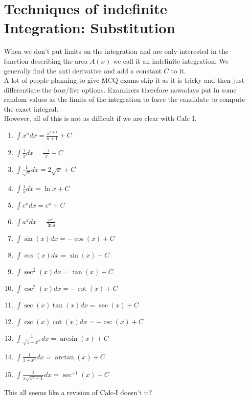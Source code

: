 \section{Techniques of indefinite Integration: Substitution}
When we don't put limits on the integration and are only interested in the function describing the area $A(x)$ we call it an indefinite integration. We generally find the anti derivative and add a constant $C$ to it.\\
A lot of people planning to give MCQ exams skip it as it is tricky and then just differentiate the four/five options. Examiners therefore nowadays put in some random values as the limits of the integration to force the candidate to compute the exact integral.\\
However, all of this is not as difficult if we are clear with Calc I.\\
\begin{theorem}
\begin{enumerate}
    \item $\int x^n dx = \frac{x^{n+1}}{n+1} + C$\\
    \item $\int \frac{1}{x} dx = \frac{-1}{x}+C$\\
    \item $\int \frac{1}{\sqrt{x}} dx = 2\sqrt{x}+C$
    \item $\int \frac{1}{x} dx=\ln{x}+C$\\
    \item $\int e^x dx = e^x+C$\\
    \item $\int a^x dx = \frac{a^x}{\ln{a}}$
    \item $\int \sin(x) dx = -\cos(x) + C$
    \item $\int \cos(x) dx = \sin(x) + C$
    \item $\int \sec^2(x) dx = \tan(x) + C$
    \item $\int \csc^2(x) dx = -\cot(x) + C$
    \item $\int \sec(x)\tan(x) dx = \sec(x) + C$
    \item $\int \csc(x)\cot(x) dx = -\csc(x) + C$
    \item $\int \frac{1}{\sqrt{1-x^2}}dx=\arcsin(x)+C$
    \item $\int \frac{1}{1+x^2}dx=\arctan(x)+C$
    \item $\int \frac{1}{x\sqrt{x^2-1}}dx=\sec^{-1}(x)+C$
\end{enumerate}
\end{theorem}
This all seems like a revision of Calc-I doesn't it?\\
